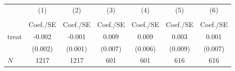 {
\def\sym#1{\ifmmode^{#1}\else\(^{#1}\)\fi}
\begin{tabular}{l*{6}{c}}
\hline\hline
            &\multicolumn{1}{c}{(1)}&\multicolumn{1}{c}{(2)}&\multicolumn{1}{c}{(3)}&\multicolumn{1}{c}{(4)}&\multicolumn{1}{c}{(5)}&\multicolumn{1}{c}{(6)}\\
            &\multicolumn{1}{c}{} &\multicolumn{1}{c}{} &\multicolumn{1}{c}{} &\multicolumn{1}{c}{} &\multicolumn{1}{c}{} &\multicolumn{1}{c}{} \\
            &    Coef./SE         &    Coef./SE         &    Coef./SE         &    Coef./SE         &    Coef./SE         &    Coef./SE         \\
\hline
treat       &      -0.002         &      -0.001         &       0.009         &       0.009         &       0.003         &       0.001         \\
            &     (0.002)         &     (0.001)         &     (0.007)         &     (0.006)         &     (0.009)         &     (0.007)         \\
\hline
\(N\)       &        1217         &        1217         &         601         &         601         &         616         &         616         \\
\hline\hline
\end{tabular}
}
